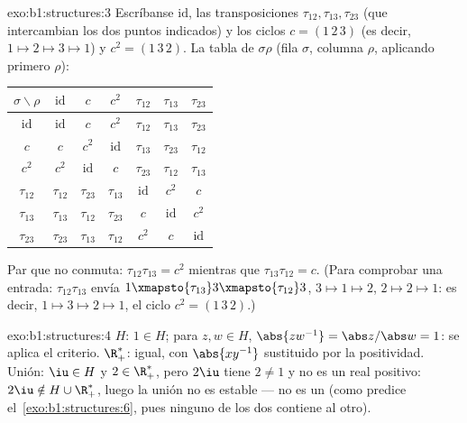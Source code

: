\begin{solution}{exo:b1:structures:3}
Escríbanse $\mathrm{id}$, las transposiciones $\tau_{12}, \tau_{13},
\tau_{23}$ (que intercambian los dos puntos indicados) y los ciclos
$c = (1\,2\,3)$ (es decir, $1 \mapsto 2 \mapsto 3 \mapsto 1$) y
$c^2 = (1\,3\,2)$. La tabla de $\sigma\rho$ (fila $\sigma$, columna
$\rho$, aplicando primero $\rho$):
\begin{center}
\renewcommand{\arraystretch}{1.2}
\begin{tabular}{c|cccccc}
$\sigma\backslash\rho$ & $\mathrm{id}$ & $c$ & $c^2$ & $\tau_{12}$ &
$\tau_{13}$ & $\tau_{23}$ \\
\hline
$\mathrm{id}$ & $\mathrm{id}$ & $c$ & $c^2$ & $\tau_{12}$ &
$\tau_{13}$ & $\tau_{23}$ \\
$c$ & $c$ & $c^2$ & $\mathrm{id}$ & $\tau_{13}$ & $\tau_{23}$ &
$\tau_{12}$ \\
$c^2$ & $c^2$ & $\mathrm{id}$ & $c$ & $\tau_{23}$ & $\tau_{12}$ &
$\tau_{13}$ \\
$\tau_{12}$ & $\tau_{12}$ & $\tau_{23}$ & $\tau_{13}$ & $\mathrm{id}$
& $c^2$ & $c$ \\
$\tau_{13}$ & $\tau_{13}$ & $\tau_{12}$ & $\tau_{23}$ & $c$ &
$\mathrm{id}$ & $c^2$ \\
$\tau_{23}$ & $\tau_{23}$ & $\tau_{13}$ & $\tau_{12}$ & $c^2$ & $c$ &
$\mathrm{id}$ \\
\end{tabular}
\end{center}
Par que no conmuta: $\tau_{12}\tau_{13} = c^2$ mientras que
$\tau_{13}\tau_{12} = c$. (Para comprobar una entrada:
$\tau_{12}\tau_{13}$ envía $1 \xmapsto{\tau_{13}} 3
\xmapsto{\tau_{12}} 3$, $3 \mapsto 1 \mapsto 2$, $2 \mapsto 2 \mapsto
1$: es decir, $1 \mapsto 3 \mapsto 2 \mapsto 1$, el ciclo $c^2 =
(1\,3\,2)$.)
\end{solution}

\begin{solution}{exo:b1:structures:4}
$H$: $1 \in H$; para $z, w \in H$, $\abs{zw^{-1}} = \abs z / \abs w =
1$: se aplica el criterio. $\R_+^*$: igual, con $\abs{xy^{-1}}$
sustituido por la positividad. Unión: $\iu \in H$ y $2 \in \R_+^*$,
pero $2\iu$ tiene  $2 \neq 1$ y no es un real positivo:
$2\iu \notin H \cup \R_+^*$, luego la unión no es estable --- no es un
 (como predice el~\cref{exo:b1:structures:6}, pues ninguno de
los dos  contiene al otro).
\end{solution}

